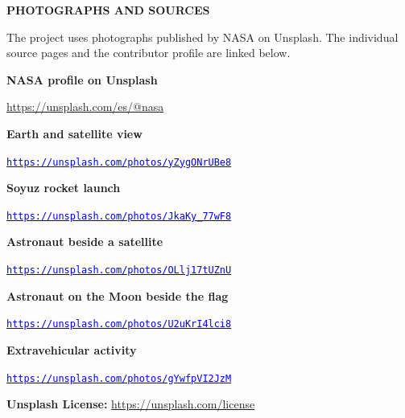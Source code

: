 \documentclass[10pt,a4paper]{article}
\newcommand{\heading}[2]{\par\vspace{8pt}{\large\bfseries\color{navy}#1}\hfill{\footnotesize\bfseries\color{blue}#2}\par\vspace{-1pt}{\color{blue}\rule{\linewidth}{1pt}}\vspace{3pt}}
\begin{document}
\newpage
\heading{18  Image credits}{PHOTOGRAPHS AND SOURCES}
The project uses photographs published by NASA on Unsplash. The individual source pages and the contributor profile are linked below.
\begin{infobox}
\textbf{NASA profile on Unsplash}\par
\url{https://unsplash.com/es/@nasa}\par
\end{infobox}
\vspace{5pt}
{\small\bfseries\color{navy}Earth and satellite view}\par
\href{https://unsplash.com/es/fotos/vista-de-la-tierra-y-satelite-yZygONrUBe8}{\textcolor{blue}{\nolinkurl{https://unsplash.com/photos/yZygONrUBe8}}}\par
\vspace{5pt}
{\small\bfseries\color{navy}Soyuz rocket launch}\par
\href{https://unsplash.com/es/fotos/el-cohete-soyuz-se-lanza-desde-la-plataforma-de-lanzamiento-de-baikonur-JkaKy_77wF8}{\textcolor{blue}{\nolinkurl{https://unsplash.com/photos/JkaKy_77wF8}}}\par
\vspace{5pt}
{\small\bfseries\color{navy}Astronaut beside a satellite}\par
\href{https://unsplash.com/es/fotos/fotografia-de-un-astronauta-junto-al-satelite-OLlj17tUZnU}{\textcolor{blue}{\nolinkurl{https://unsplash.com/photos/OLlj17tUZnU}}}\par
\vspace{5pt}
{\small\bfseries\color{navy}Astronaut on the Moon beside the flag}\par
\href{https://unsplash.com/es/fotos/astronauta-de-pie-en-la-luna-junto-a-la-bandera-de-eeuu-U2uKrI4lci8}{\textcolor{blue}{\nolinkurl{https://unsplash.com/photos/U2uKrI4lci8}}}\par
\vspace{5pt}
{\small\bfseries\color{navy}Extravehicular activity}\par
\href{https://unsplash.com/es/fotos/astronauta-de-la-nasa-realiza-actividad-extravehicular-gYwfpVI2JzM}{\textcolor{blue}{\nolinkurl{https://unsplash.com/photos/gYwfpVI2JzM}}}\par
\vspace{8pt}
\textbf{Unsplash License:} \url{https://unsplash.com/license}



\end{document}
